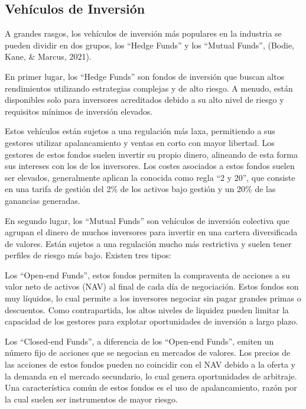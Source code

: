 \documentclass[12pt,a4paper]{article}
\begin{document}
\subsection{Vehículos de Inversión}

A grandes rasgos, los vehículos de inversión más populares en la industria se pueden dividir en dos grupos, los ``Hedge Funds'' y los ``Mutual Funds'', (Bodie, Kane, \& Marcus, 2021).

En primer lugar, los ``Hedge Funds'' son fondos de inversión que buscan altos rendimientos utilizando estrategias complejas y de alto riesgo. A menudo, están disponibles solo para inversores acreditados debido a su alto nivel de riesgo y requisitos mínimos de inversión elevados. 

Estos vehículos están sujetos a una regulación más laxa, permitiendo a sus gestores utilizar apalancamiento y ventas en corto con mayor libertad. Los gestores de estos fondos suelen invertir su propio dinero, alineando de esta forma sus intereses con los de los inversores. Los costes asociados a estos fondos suelen ser elevados, generalmente aplican la conocida como regla ``2 y 20'', que consiste en una tarifa de gestión del 2\% de los activos bajo gestión y un 20\% de las ganancias generadas.

En segundo lugar, los ``Mutual Funds'' son vehículos de inversión colectiva que agrupan el dinero de muchos inversores para invertir en una cartera diversificada de valores. Están sujetos a una regulación mucho más restrictiva y suelen tener perfiles de riesgo más bajo. Existen tres tipos:

Los ``Open-end Funds'', estos fondos permiten la compraventa de acciones a su valor neto de activos (NAV) al final de cada día de negociación. Estos fondos son muy líquidos, lo cual permite a los inversores negociar sin pagar grandes primas o descuentos. Como contrapartida, los altos niveles de liquidez pueden limitar la capacidad de los gestores para explotar oportunidades de inversión a largo plazo.

Los ``Closed-end Funds'', a diferencia de los ``Open-end Funds'', emiten un número fijo de acciones que se negocian en mercados de valores. Los precios de las acciones de estos fondos pueden no coincidir con el NAV debido a la oferta y la demanda en el mercado secundario, lo cual genera oportunidades de arbitraje. Una característica común de estos fondos es el uso de apalancamiento, razón por la cual suelen ser instrumentos de mayor riesgo.
\end{document}
